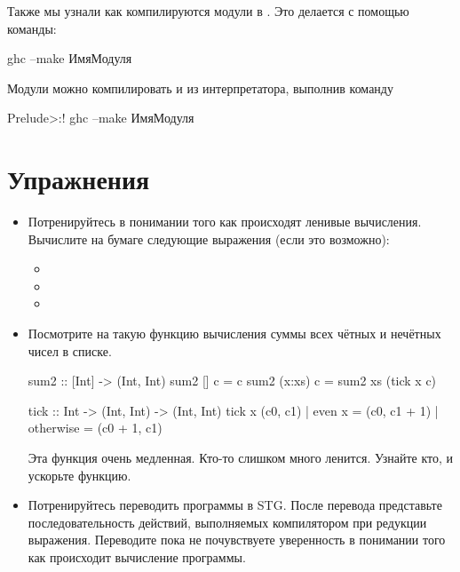 Также мы узнали как компилируются модули в . Это делается
с помощью команды:

\begin{code}
ghc --make ИмяМодуля
\end{code}

Модули можно компилировать и из интерпретатора, выполнив команду

\begin{code}
Prelude>:! ghc --make ИмяМодуля
\end{code}

\section{Упражнения}

\begin{itemize}

\item Потренируйтесь в понимании того как происходят
        ленивые вычисления. Вычислите на бумаге 
        следующие выражения (если это возможно):

\begin{itemize}
\item 
{}

\item {}
\item {}
\end{itemize}

\item Посмотрите на такую функцию вычисления суммы
        всех чётных и нечётных чисел в списке. 

\begin{code}
sum2 :: [Int] -> (Int, Int)
sum2 []     c = c
sum2 (x:xs) c = sum2 xs (tick x c)

tick :: Int -> (Int, Int) -> (Int, Int)
tick x (c0, c1) | even x    = (c0, c1 + 1)
                | otherwise = (c0 + 1, c1)
\end{code} 

    Эта функция очень медленная. Кто-то слишком много ленится.
    Узнайте кто, и ускорьте функцию.
   
\item Потренируйтесь переводить программы в STG.
    После перевода представьте последовательность действий,
    выполняемых компилятором при редукции выражения.
    Переводите пока не почувствуете уверенность в понимании того как 
    происходит вычисление программы.
\end{itemize}
